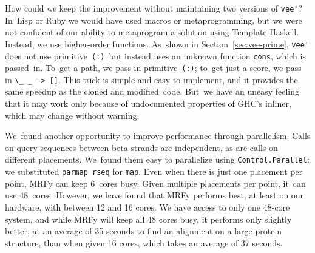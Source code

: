 \documentclass[nonatbib,preprint,blockstyle,times]{sigplanconf}
\newcommand\primcons{\texttt{\small(:)}}
\newcommand\secref[1]{Section~\ref{sec:#1}}
\begin{document}
How could we keep the improvement without 
maintaining two versions of \verb+vee'+?
In~Lisp or Ruby we would have used macros or metaprogramming,
but we were not confident of our ability to metaprogram a solution
using Template Haskell.
Instead, we use higher-order functions.
As~shown in \secref{vee-prime},
\verb+vee'+ does not use primitive~\primcons\ but instead
uses an unknown function \texttt{cons}, which is
passed~in.
To~get a path, we pass in primitive~\primcons;
to~get just a score, we pass in
\verb+\_ _ -> []+.
This trick is simple and easy to implement, and it provides the same
speedup as the cloned and modified~code.
But~we have an uneasy feeling that it may work only because of
undocumented properties of GHC's inliner, which may 
change without warning. 



We~found another opportunity to improve performance through parallelism.
Calls on query sequences between beta strands are independent,
as are calls on different placements.
We~found them easy to parallelize
using
\texttt{Control.Parallel}:
we substituted
\texttt{parmap rseq} for \texttt{map}.
Even when there is just one placement per point,
MRFy can keep 6~cores busy.
Given multiple placements per point,
it~can use 48~cores.
However, we have found that MRFy performs best, at least on our
hardware, with between 12 and 16 cores.
We have access to only
one 48-core system, and while MRFy will keep all 48 cores busy, it
performs only slightly better, at an average of 35 seconds to find an alignment
on a large protein structure, than when given 16
cores, which takes an average 
of 37 seconds. 
\end{document}

